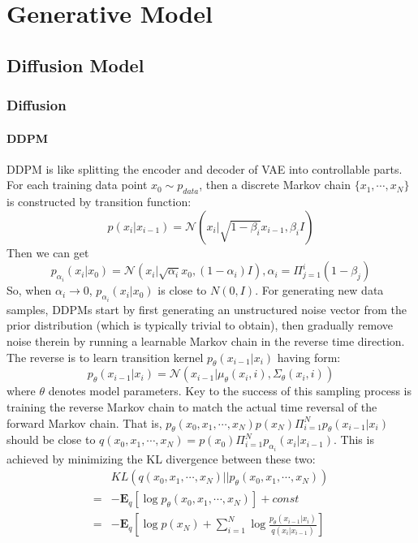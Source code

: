 \section{Generative Model}

\subsection{Diffusion Model}
\subsubsection{Diffusion}
\paragraph{DDPM}
DDPM is like splitting the encoder and decoder of VAE into controllable parts. 
For each training data point $x_0\sim p_{data}$, then a discrete Markov chain $\{x_1, \cdots, x_N\}$ is constructed by transition function:
\begin{equation}
    p(x_i|x_{i-1})=\mathcal{N}(x_i|\sqrt{1-\beta_i}x_{i-1}, \beta_i I)
\end{equation}
Then we can get 
\begin{equation}
    p_{\alpha_i}(x_i|x_0) = \mathcal{N}(x_i|\sqrt{\alpha_i}x_0, (1-\alpha_i)I), \alpha_i = \Pi_{j=1}^i(1-\beta_j)
\end{equation}
So, when $\alpha_i\to 0$, $p_{\alpha_i}(x_i|x_0)$ is close to $N(0, I)$. For generating  new data samples, DDPMs start by first generating an unstructured noise vector from the prior distribution (which is  typically trivial to obtain), then gradually remove noise therein by running a learnable Markov chain in the reverse  time direction.
The reverse is to learn transition kernel $p_\theta(x_{i-1}|x_i)$ having form:
\begin{equation}
    p_\theta(x_{i-1}|x_i) = \mathcal{N}(x_{i-1}|\mu_\theta(x_i, i), \Sigma_\theta(x_i, i))
\end{equation}
where $\theta$ denotes model parameters. Key to the success of this sampling process is training the reverse Markov chain to match the actual time reversal  of the forward Markov chain.
That is, $p_\theta(x_0, x_1, \cdots, x_N)p(x_N)\Pi_{i=1}^Np_\theta(x_{i-1}|x_i)$ should be close to $q(x_0, x_1, \cdots, x_N)=p(x_0)\Pi_{i=1}^Np_{\alpha_i}(x_i|x_{i-1})$.
This is achieved by minimizing the KL divergence between these two:
\begin{equation}
    \begin{aligned}
        &KL(q(x_0, x_1, \cdots, x_N)||p_\theta(x_0, x_1, \cdots, x_N))\\
        =&-\mathbf{E}_{q}\left[\log p_\theta(x_0, x_1, \cdots, x_N)\right] + const\\
        =&-\mathbf{E}_{q}\left[\log p(x_N) + \sum_{i=1}^N \log \frac{p_\theta(x_{i-1}|x_i)}{q(x_i|x_{i-1})}\right]
    \end{aligned}
\end{equation}

